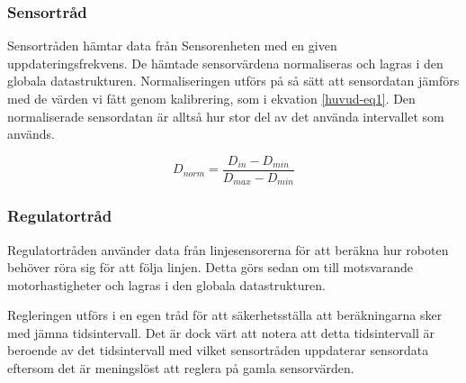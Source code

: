 \subsubsection{Sensortråd}
Sensortråden hämtar data från Sensorenheten med en given uppdateringsfrekvens. De hämtade sensorvärdena normaliseras och lagras i den globala datastrukturen. Normaliseringen utförs på så sätt att sensordatan jämförs med de värden vi fått genom kalibrering, som i ekvation \ref{huvud-eq1}. Den normaliserade sensordatan är alltså hur stor del av det använda intervallet som används.

\begin{equation} \label{huvud-eq1}
	D_{norm}=\frac{D_{in}-D_{min}}{D_{max}-D_{min}}
\end{equation}

\subsubsection{Regulatortråd} \label{huvud-regulator}
Regulatortråden använder data från linjesensorerna för att beräkna hur roboten behöver röra sig för att följa linjen. Detta görs sedan om till motsvarande motorhastigheter och lagras i den globala datastrukturen.

Regleringen utförs i en egen tråd för att säkerhetsställa att beräkningarna sker med jämna tidsintervall. Det är dock värt att notera att detta tidsintervall är beroende av det tidsintervall med vilket sensortråden uppdaterar sensordata eftersom det är meningslöst att reglera på gamla sensorvärden.

